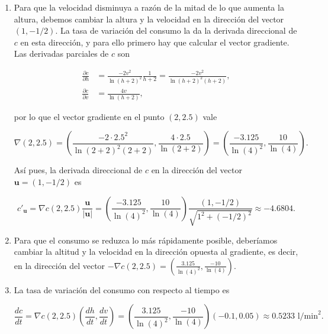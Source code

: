 \documentclass[
  spanish,
  a4paper,
]{scrreport}
\theoremstyle{definition}
\theoremstyle{remark}
\begin{document}
\begin{tcolorbox}[enhanced jigsaw, arc=.35mm, bottomrule=.15mm, bottomtitle=1mm, breakable, colback=white, colbacktitle=quarto-callout-tip-color!10!white, colframe=quarto-callout-tip-color-frame, coltitle=black, left=2mm, leftrule=.75mm, opacityback=0, opacitybacktitle=0.6, rightrule=.15mm, title=\textcolor{quarto-callout-tip-color}{\faLightbulb}\hspace{0.5em}{Solución}, titlerule=0mm, toprule=.15mm, toptitle=1mm]

\begin{enumerate}
\def\labelenumi{\alph{enumi}.}
\item
  Para que la velocidad disminuya a razón de la mitad de lo que aumenta
  la altura, debemos cambiar la altura y la velocidad en la dirección
  del vector \((1, -1/2)\). La tasa de variación del consumo la da la
  derivada direccional de \(c\) en esta dirección, y para ello primero
  hay que calcular el vector gradiente. Las derivadas parciales de \(c\)
  son

  \begin{align*}
  \frac{\partial c}{\partial h} 
  &= \frac{-2v^2}{\ln(h+2)^2}\frac{1}{h+2}
  = \frac{-2v^2}{\ln(h+2)^2(h+2)}, \\
  \frac{\partial c}{\partial v} 
  &= \frac{4v}{\ln(h+2)},
  \end{align*}

  por lo que el vector gradiente en el punto \((2, 2.5)\) vale

  \[
  \nabla (2, 2.5) 
  = \left(\frac{-2\cdot 2.5^2}{\ln(2+2)^2(2+2)}, \frac{4\cdot 2.5}{\ln(2+2)}\right)
  = \left(\frac{-3.125}{\ln(4)^2}, \frac{10}{\ln(4)}\right).
  \]

  Así pues, la derivada direccional de \(c\) en la dirección del vector
  \(\mathbf{u}=(1, -1/2)\) es

  \[
  c'_{\mathbf{u}} 
  = \nabla c(2, 2.5) \frac{\mathbf{u}}{|\mathbf{u}|}
  = \left(\frac{-3.125}{\ln(4)^2}, \frac{10}{\ln(4)}\right) \frac{(1, -1/2)}{\sqrt{1^2 + (-1/2)^2}} \approx -4.6804.
  \]
\item
  Para que el consumo se reduzca lo más rápidamente posible, deberíamos
  cambiar la altitud y la velocidad en la dirección opuesta al
  gradiente, es decir, en la dirección del vector
  \(-\nabla c(2,2.5) = \left(\frac{3.125}{\ln(4)^2}, \frac{-10}{\ln(4)}\right)\).
\item
  La tasa de variación del consumo con respecto al tiempo es

  \[
  \frac{dc}{dt} 
  = \nabla c(2, 2.5) \left(\frac{dh}{dt}, \frac{dv}{dt}\right)
  = \left(\frac{3.125}{\ln(4)^2}, \frac{-10}{\ln(4)}\right) (-0.1, 0.05)
  \approx 0.5233 \mbox{ l/min}^2.
  \]
\end{enumerate}

\end{tcolorbox}
\end{document}
